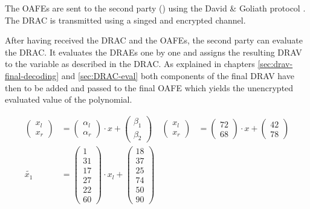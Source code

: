 The OAFEs are sent to the second party (\JWpTwo{}) using the David \& Goliath
protocol \cite{davidgoliath}. The DRAC is transmitted using a singed and
encrypted channel.

After having received the DRAC and the OAFEs, the second party can evaluate the
DRAC. It evaluates the DRAEs one by one and assigns the resulting DRAV to the
variable as described in the DRAC. As explained in chapters
\ref{sec:drav-final-decoding} and \ref{sec:DRAC-eval} both components of the
final DRAV have then to be added and passed to the final OAFE which yields the
unencrypted evaluated value of the polynomial.


%
%
\label{sec:example}


\begin{align*}
%
\begin{pmatrix}x_l\\x_r\end{pmatrix} &=
\begin{pmatrix}\alpha_l\\\alpha_r\end{pmatrix}
\cdot x +
\begin{pmatrix}\beta_1\\\beta_2\end{pmatrix}
&
\begin{pmatrix}x_l\\x_r\end{pmatrix} &=
\begin{pmatrix}72\\68\end{pmatrix}
\cdot x +
\begin{pmatrix}42\\78\end{pmatrix}
\\
%
\widetilde{x_1} & =
\begin{pmatrix}1\\31\\17\\27\\22\\60\end{pmatrix}
\cdot x_l +
\begin{pmatrix}18\\37\\25\\74\\50\\90\end{pmatrix}

\end{align*}
